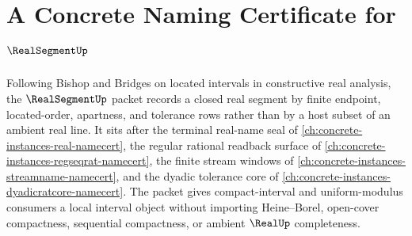 \chapter{A Concrete Naming Certificate for $\RealSegmentUp$}
\label{ch:concrete-instances-real-segment-namecert}

Following Bishop and Bridges on located intervals in constructive real analysis, the $\RealSegmentUp$ packet records a closed real segment by finite endpoint, located-order, apartness, and tolerance rows rather than by a host subset of an ambient real line. It sits after the terminal real-name seal of \autoref{ch:concrete-instances-real-namecert}, the regular rational readback surface of \autoref{ch:concrete-instances-regseqrat-namecert}, the finite stream windows of \autoref{ch:concrete-instances-streamname-namecert}, and the dyadic tolerance core of \autoref{ch:concrete-instances-dyadicratcore-namecert}. The packet gives compact-interval and uniform-modulus consumers a local interval object without importing Heine--Borel, open-cover compactness, sequential compactness, or ambient $\RealUp$ completeness.

